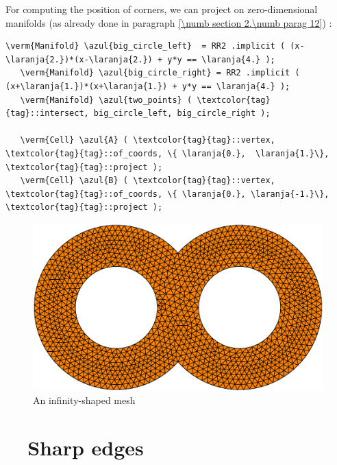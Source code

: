 For computing the position of corners, we can project on zero-dimensional manifolds
(as already done in paragraph \ref{\numb section 2.\numb parag 12}) :

\begin{Verbatim}[commandchars=\\\{\},formatcom=\small\tt,frame=single,
   label=parag-\ref{\numb section 3.\numb parag 18}.cpp,rulecolor=\color{moldura},
   baselinestretch=0.94,framesep=2mm                                              ]
   \verm{Manifold} \azul{big_circle_left}  = RR2 .implicit ( (x-\laranja{2.})*(x-\laranja{2.}) + y*y == \laranja{4.} );
   \verm{Manifold} \azul{big_circle_right} = RR2 .implicit ( (x+\laranja{1.})*(x+\laranja{1.}) + y*y == \laranja{4.} );
   \verm{Manifold} \azul{two_points} ( \textcolor{tag}{tag}::intersect, big_circle_left, big_circle_right );

   \verm{Cell} \azul{A} ( \textcolor{tag}{tag}::vertex, \textcolor{tag}{tag}::of_coords, \{ \laranja{0.},  \laranja{1.}\}, \textcolor{tag}{tag}::project );
   \verm{Cell} \azul{B} ( \textcolor{tag}{tag}::vertex, \textcolor{tag}{tag}::of_coords, \{ \laranja{0.}, \laranja{-1.}\}, \textcolor{tag}{tag}::project );
\end{Verbatim}

\begin{figure}[ht] \centering
 \includegraphics[width=120mm]{infinity}
  \caption{An infinity-shaped mesh}
  \label{\numb section 3.\numb fig 5}
\end{figure}


\section{~~Sharp edges}\label{\numb section 3.\numb parag 19}

